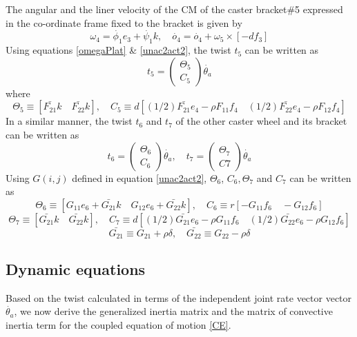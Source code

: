 The angular and the liner velocity of the CM of the caster bracket\#5  expressed in the co-ordinate frame fixed to the bracket is given by
\begin{equation}
\omega_4=\dot{\phi_1}e_3+\dot{\psi_1}k, \quad
\dot{o_4}=\dot{o_4}+\omega_5\times [-df_3]
\end{equation}
Using equations   \ref{omegaPlat} \& \ref{unac2act2}, the twist $t_5$ can be written as
\begin{equation}
\label{twist5}
t_5=\begin{pmatrix}
\Theta_5\\C_5
\end{pmatrix}\dot{\theta_a}
\end{equation}
where
\[ \Theta_5 \equiv [\bar{F_{21}}k \quad \bar{F_{22}}k],\quad 
C_5\equiv d[(1/2)\bar{F_{21}}e_4-\rho F_{11}f_4 \quad (1/2)\bar{F_{22}}e_4-\rho F_{12}f_4]\]
In a similar manner, the twist $t_6$ and $t_7$  of the other caster wheel and its bracket can be written as 
\begin{equation}
\label{twist6}
t_6=\begin{pmatrix}
\Theta_6\\C_6
\end{pmatrix}\dot{\theta_a}, \quad t_7=\begin{pmatrix}
\Theta_7\\C7
\end{pmatrix}\dot{\theta_a}
\end{equation}
Using  $G(i,j)$ defined in  equation \ref{unac2act2}, $\Theta_6$, $C_6, \Theta_7$ and $C_7$ can be written as 
\[ \Theta_6 \equiv [G_{11}e_6+\bar{G_{21}}k \quad G_{12}e_6+\bar{G_{22}}k],\quad 
C_6 \equiv r[-G_{11}f_6 \quad -G_{12}f_6]\]
\[ \Theta_7 \equiv [\bar{G_{21}}k \quad \bar{G_{22}}k],\quad 
C_7 \equiv d[(1/2)\bar{G_{21}}e_6-\rho G_{11}f_6 \quad (1/2)\bar{G_{22}}e_6-\rho G_{12}f_6]\]
\[\bar{G_{21}} \equiv G_{21}+\rho \delta, \quad \bar{G_{22}}\equiv G_{22}-\rho\delta\] 

\subsection{Dynamic equations}
Based on the twist calculated in terms of the independent joint rate vector vector $\dot{\theta_a}$, we now derive the generalized inertia matrix and the matrix of convective inertia term for the coupled equation of motion \ref{CE}.
